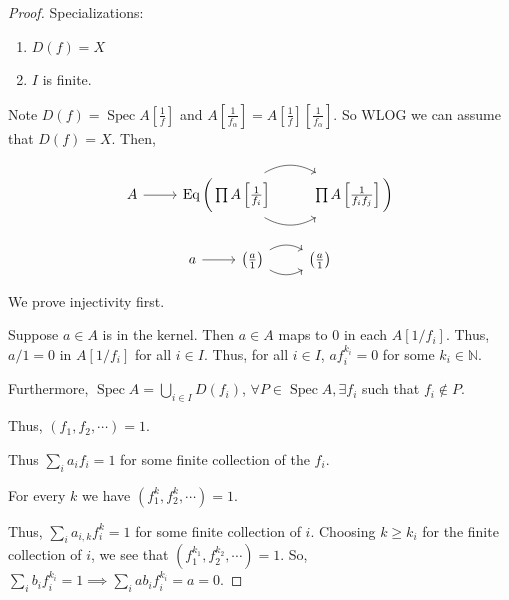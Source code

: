 \documentclass{article}
\theoremstyle{definition}
\begin{document}
    \begin{proof}

        Specializations:

        \begin{enumerate}[label=\arabic*)]
            \item \(D(f) = X\)
            \item \(I\) is finite. 
        \end{enumerate} 

        Note \(D(f) = \operatorname{Spec} A \left[ \frac{1}{f} \right] \) and \(A \left[ \frac{1}{f_\alpha} \right] = A \left[ \frac{1}{f} \right] \left[ \frac{1}{f_\alpha} \right] \). So WLOG we can assume that \(D(f) = X\). Then,

        \[
            \begin{tikzcd}
                A \ar[r] & \operatorname{Eq} \bigg(  \prod A \left[ \frac{1}{f_i} \right] \ar[r, bend left] \ar[r, bend right] & \prod A \left[ \frac{1}{f_i f_j} \right] \bigg)
            \end{tikzcd}
        \]

        \[
            \begin{tikzcd}
                a \ar[r] & \left( \frac{a}{1} \right) \ar[r, bend right] \ar[r, bend left] & \left( \frac{a}{1} \right) 
            \end{tikzcd}
        \]

        We prove injectivity first.

        Suppose \(a\in A\) is in the kernel. Then \(a\in A\) maps to \(0\) in each \(A[1 / f_i]\). Thus, \(a / 1 = 0\) in \(A[1 / f_i]\) for all \(i \in I\). Thus, for all \(i\in I\), \(a f_i^{k_i} = 0\) for some \(k_i \in \mathbb{N}\).
        
        Furthermore, \(\operatorname{Spec} A = \bigcup_{i\in I} D(f_i)\), \(\forall P\in \operatorname{Spec} A, \exists f_i\) such that \(f_i \notin P\).

        Thus, \((f_1, f_2, \cdots) = 1\).

        Thus \(\sum_{i} a_i f_i = 1\) for some finite collection of the \(f_i\).

        For every \(k\) we have \((f_1^k, f_2^k, \cdots ) = 1\).

        Thus, \(\sum_{i} a_{i,k} f_i^k = 1\) for some finite collection of \(i\). Choosing \(k \geq k_i\) for the finite collection of \(i\), we see that \((f_1^{k_1}, f_2^{k_2}, \cdots ) = 1\). So, \(\sum_{i} b_i f_i^{k_i} = 1 \implies \sum_{i} a b_i f_i^{k_i} = a  = 0\).


\end{proof}
\end{document}
